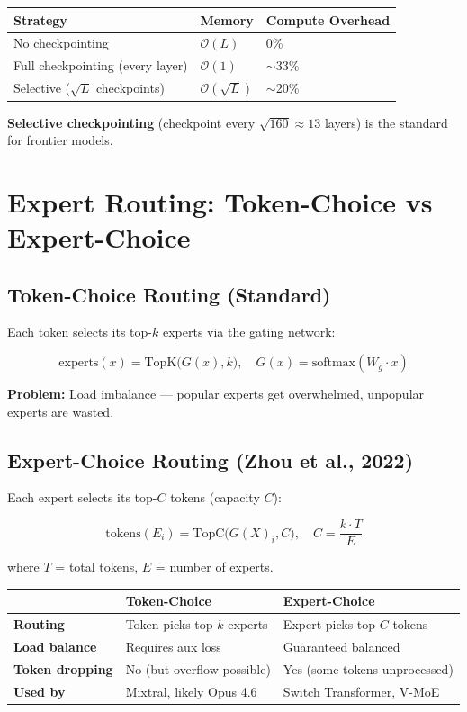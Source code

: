 \documentclass[11pt,a4paper]{article}
\begin{document}
\begin{center}
\begin{tabular}{lll}
\toprule
\textbf{Strategy} & \textbf{Memory} & \textbf{Compute Overhead} \\
\midrule
No checkpointing & $\mathcal{O}(L)$ & 0\% \\
Full checkpointing (every layer) & $\mathcal{O}(1)$ & $\sim$33\% \\
Selective ($\sqrt{L}$ checkpoints) & $\mathcal{O}(\sqrt{L})$ & $\sim$20\% \\
\bottomrule
\end{tabular}
\end{center}

\textbf{Selective checkpointing} (checkpoint every $\sqrt{160} \approx 13$ layers) is the standard for frontier models.

\section{Expert Routing: Token-Choice vs Expert-Choice}

\subsection{Token-Choice Routing (Standard)}

Each token selects its top-$k$ experts via the gating network:

$$\text{experts}(x) = \text{TopK}\big(G(x), k\big), \quad G(x) = \text{softmax}(W_g \cdot x)$$

\textbf{Problem:} Load imbalance --- popular experts get overwhelmed, unpopular experts are wasted.

\subsection{Expert-Choice Routing (Zhou et al., 2022)}

Each expert selects its top-$C$ tokens (capacity $C$):

$$\text{tokens}(E_i) = \text{TopC}\big(G(X)_i, C\big), \quad C = \frac{k \cdot T}{E}$$

where $T$ = total tokens, $E$ = number of experts.

\begin{center}
\begin{tabular}{lL{5cm}L{5cm}}
\toprule
& \textbf{Token-Choice} & \textbf{Expert-Choice} \\
\midrule
\textbf{Routing} & Token picks top-$k$ experts & Expert picks top-$C$ tokens \\
\textbf{Load balance} & Requires aux loss & Guaranteed balanced \\
\textbf{Token dropping} & No (but overflow possible) & Yes (some tokens unprocessed) \\
\textbf{Used by} & Mixtral, likely Opus 4.6 & Switch Transformer, V-MoE \\
\bottomrule
\end{tabular}
\end{center}
\end{document}
